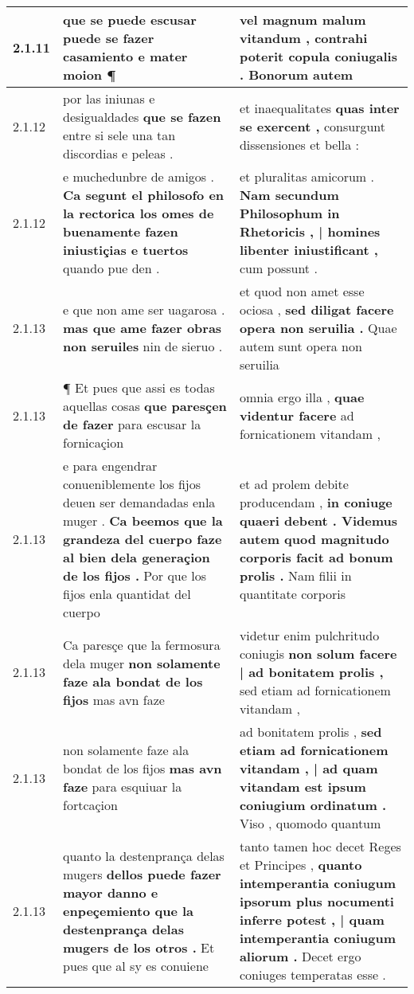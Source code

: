 \begin{tabular}{|p{1cm}|p{6.5cm}|p{6.5cm}|}
2.1.11 & que se puede escusar \textbf{ puede se fazer casamiento } e mater moion ¶ & vel magnum malum vitandum , \textbf{ contrahi poterit copula coniugalis . } Bonorum autem \\\hline
2.1.12 & por las iniunas e desigualdades \textbf{ que se fazen } entre si sele una tan discordias e peleas . & et inaequalitates \textbf{ quas inter se exercent , } consurgunt dissensiones et bella : \\\hline
2.1.12 & e muchedunbre de amigos . \textbf{ Ca segunt el philosofo en la rectorica los omes de buenamente fazen iniustiçias e tuertos } quando pue den . & et pluralitas amicorum . \textbf{ Nam secundum Philosophum in Rhetoricis , | homines libenter iniustificant , } cum possunt . \\\hline
2.1.13 & e que non ame ser uagarosa . \textbf{ mas que ame fazer obras non seruiles } nin de sieruo . & et quod non amet esse ociosa , \textbf{ sed diligat facere opera non seruilia . } Quae autem sunt opera non seruilia \\\hline
2.1.13 & ¶ Et pues que assi es todas aquellas cosas \textbf{ que paresçen de fazer } para escusar la fornicaçion & omnia ergo illa , \textbf{ quae videntur facere } ad fornicationem vitandam , \\\hline
2.1.13 & e para engendrar conueniblemente los fijos deuen ser demandadas enla muger . \textbf{ Ca beemos que la grandeza del cuerpo faze al bien dela generaçion de los fijos . } Por que los fijos enla quantidat del cuerpo & et ad prolem debite producendam , \textbf{ in coniuge quaeri debent . Videmus autem quod magnitudo corporis facit ad bonum prolis . } Nam filii in quantitate corporis \\\hline
2.1.13 & Ca paresçe que la fermosura dela muger \textbf{ non solamente faze ala bondat de los fijos } mas avn faze & videtur enim pulchritudo coniugis \textbf{ non solum facere | ad bonitatem prolis , } sed etiam ad fornicationem vitandam , \\\hline
2.1.13 & non solamente faze ala bondat de los fijos \textbf{ mas avn faze } para esquiuar la fortcaçion & ad bonitatem prolis , \textbf{ sed etiam ad fornicationem vitandam , | ad quam vitandam est ipsum coniugium ordinatum . } Viso , quomodo quantum \\\hline
2.1.13 & quanto la destenprança delas mugers \textbf{ dellos puede fazer mayor danno e enpeçemiento que la destenprança delas mugers de los otros . } Et pues que al sy es conuiene & tanto tamen hoc decet Reges et Principes , \textbf{ quanto intemperantia coniugum ipsorum plus nocumenti inferre potest , | quam intemperantia coniugum aliorum . } Decet ergo coniuges temperatas esse . \\\hline

\end{tabular}
